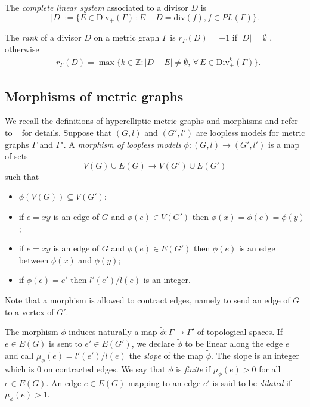 \documentclass[11pt]{article}
\theoremstyle{definition}
\numberwithin{equation}{section}
\theoremstyle{definition}
\newcommand{\ZZ}{\mathbb{Z}}
\newcommand{\Ga}{\Gamma}
\begin{document}
The \emph{complete linear system} associated to a divisor $D$ is
\[
|D|:=\{E\in\mathrm{Div}_+(\Ga) \,:E-D=\mathrm{div}(f), f\in PL(\Ga)\}.
\]


     
	  The \emph{rank} of a divisor $D$ on a metric graph $\Gamma$ 
	  is $r_{\Gamma}(D)=-1$ 
	   if $|D|=\emptyset$
	   , 
	   otherwise
	  \begin{equation*}
	  \begin{aligned}
	  &r_{\Gamma}(D)=\max\{k\in \ZZ: |D-E|\ne\emptyset,\,\forall\,E\in\mathrm{Div}^k_+(\Gamma) \}. 
	  \end{aligned}
	  \end{equation*}


\subsection{Morphisms of metric graphs}
We recall the definitions of hyperelliptic metric graphs and morphisms and refer to ~\cite{CH, LenUlirschZakharov_abelianCovers} for details. 
Suppose that $(G,l)$ and $(G',l')$ are loopless models for metric graphs $\Ga$ and $\Ga'$. A \emph{morphism of loopless models} $\phi\colon(G,l)\to (G',l')$ is a map of sets 
\[
V(G)\cup E(G)\to V(G')\cup E(G')
\]
such that
\begin{itemize}
    \item[i)] $\phi(V(G))\subseteq V(G')$;
    \item[ii)] if $e=xy$ is an edge of $G$ and $\phi(e)\in V(G')$ then $\phi(x)=\phi(e)=\phi(y)$;
    \item[iii)] if $e=xy$ is an edge of $G$ and $\phi(e)\in E(G')$  then $\phi(e)$ is an edge between $\phi(x)$ and $\phi(y)$;
    \item[iv)] if $\phi(e)=e'$ then $l'(e')/l(e)$ is an integer.
\end{itemize}
Note that a morphism is allowed to contract edges, namely to send an edge of $G$ to a vertex of $G'$.

The morphism $\phi$ induces naturally a map $\tilde{\phi}\colon \Gamma\to \Gamma'$ of topological spaces. 
If $e\in E(G)$ is sent to $e'\in E(G')$, we declare $\tilde{\phi}$ to be linear along the edge $e$ and call $\mu_{\phi}(e)=l'(e')/l(e)$ the \emph{slope} of the map $\tilde\phi$.
The slope is an integer which is 0 on contracted edges.  We say that $\phi$ is \emph{finite} if $\mu_{\phi}(e)>0$ for all $e\in E(G)$. 
An edge $e\in E(G)$ mapping to an edge $e'$ is said to be \emph{dilated} if $\mu_{\phi}(e) >  1$.
\end{document}
